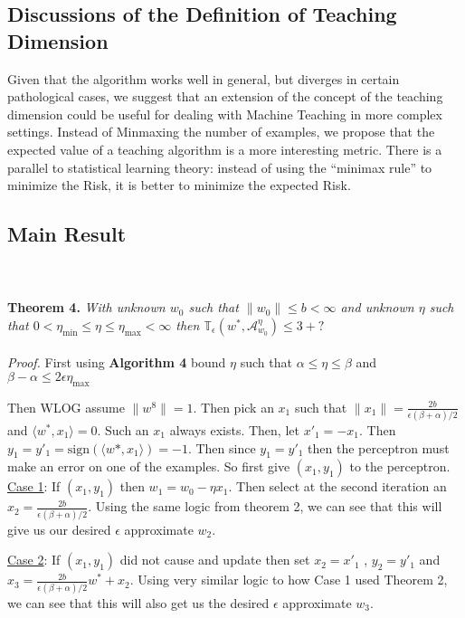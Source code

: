 \documentclass{article}
\newcommand{\learn}{\mathcal{A}_{w_0}^\eta}
\begin{document}
\subsection{Discussions of the Definition of Teaching Dimension}
Given that the algorithm works well in general, but diverges in certain pathological
cases, we suggest that an extension of the concept of the teaching dimension
could be useful for dealing with Machine Teaching in more complex settings.
Instead of Minmaxing the number of examples, we propose that the expected value
of a teaching algorithm is a more interesting metric. There is a parallel to
statistical learning theory: instead of using the ``minimax
rule'' to minimize the Risk, it is better to minimize the expected Risk.


\subsection{Main Result}
\\
\\
\textbf{Theorem 4.} 
\textit{With unknown $w_0$ such that $\lVert w_0 \rVert \leq b < \infty$
and unknown $\eta$ such that $0 < \eta_{\min} \leq \eta \leq \eta_{\max} < \infty$ then 
$
\mathbb{T}_\epsilon(w^* , \learn) \leq 3 + ?
$
}
\\
\\
\textit{Proof.}
First using \textbf{Algorithm 4} bound $\eta$ such that $ \alpha \leq \eta \leq \beta$ and $\beta - \alpha \leq 2\epsilon \eta_{\max}$

Then WLOG assume $\lVert w^8 \rVert = 1$. Then pick an $x_1$ such that 
$\lVert x_1 \rVert = \frac{2b}{\epsilon (\beta + \alpha)/2}$ and $\langle w^*, x_1 \rangle = 0$. Such an $x_1$ always exists. Then, let $x'_1 = -x_1.$ Then $y_1 = y'_1 = \text{sign}(\langle w*, x_1 \rangle) = -1$.  Then since $y_1 = y'_1$ then the perceptron must make an error on one of the examples. So first give $(x_1, y_1)$ to the perceptron.
\underline{Case 1}: If $(x_1, y_1)$ then $w_1 = w_0 - \eta x_1$. 
Then select at the second iteration an $x_2 = \frac{2b}{\epsilon (\beta + \alpha)/2}$. Using the same logic from theorem 2, we can see that this will give us our desired $\epsilon$ approximate $w_2$. 

\underline{Case 2}: If $(x_1, y_1)$ did not cause and update then set $x_2 = x'_1$ , $y_2 = y'_1$ and $x_3 = \frac{2b}{\epsilon (\beta + \alpha)/2}w^* + x_2$. Using very similar logic to how Case 1 used Theorem 2, we can see that this will also get us the desired $\epsilon$ approximate $w_3$.
\end{document}
